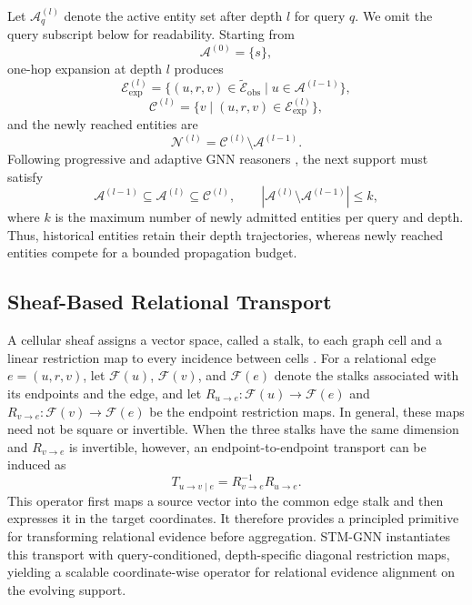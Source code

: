 \documentclass[a4paper,fleqn]{cas-sc}
\begin{document}
Let $\mathcal{A}_{q}^{(l)}$ denote the active entity set after depth $l$ for
query $q$. We omit the query subscript below for readability. Starting from
\begin{equation}
\mathcal{A}^{(0)}=\{s\},
\end{equation}
one-hop expansion at depth $l$ produces
\begin{equation}
\mathcal{E}_{\mathrm{exp}}^{(l)}
=
\{(u,r,v)\in\widetilde{\mathcal{E}}_{\mathrm{obs}}
\mid u\in\mathcal{A}^{(l-1)}\},
\end{equation}
\begin{equation}
\mathcal{C}^{(l)}
=
\{v\mid (u,r,v)\in\mathcal{E}_{\mathrm{exp}}^{(l)}\},
\end{equation}
and the newly reached entities are
\begin{equation}
\mathcal{N}^{(l)}
=
\mathcal{C}^{(l)}\setminus\mathcal{A}^{(l-1)}.
\end{equation}
Following progressive and adaptive GNN reasoners
\citep{zhu2021neural,zhang2022knowledge,zhang2022adaprop}, the next support must
satisfy
\begin{equation}
\mathcal{A}^{(l-1)}
\subseteq
\mathcal{A}^{(l)}
\subseteq
\mathcal{C}^{(l)},
\qquad
\left|\mathcal{A}^{(l)}\setminus\mathcal{A}^{(l-1)}\right|
\leq k,
\label{eq:support_constraints}
\end{equation}
where $k$ is the maximum number of newly admitted entities per query and depth.
Thus, historical entities retain their depth trajectories, whereas newly
reached entities compete for a bounded propagation budget.

\subsection{Sheaf-Based Relational Transport}\label{subsec:sheaf_preliminaries}

A cellular sheaf assigns a vector space, called a stalk, to each graph cell and
a linear restriction map to every incidence between cells
\citep{hansen2019spectral,bodnar2022neural}. For a relational edge
$e=(u,r,v)$, let $\mathcal{F}(u)$, $\mathcal{F}(v)$, and $\mathcal{F}(e)$
denote the stalks associated with its endpoints and the edge, and let
$R_{u\rightarrow e}:\mathcal{F}(u)\rightarrow\mathcal{F}(e)$ and
$R_{v\rightarrow e}:\mathcal{F}(v)\rightarrow\mathcal{F}(e)$ be the endpoint
restriction maps. In general, these maps need not be square or invertible.
When the three stalks have the same dimension and $R_{v\rightarrow e}$ is
invertible, however, an endpoint-to-endpoint transport can be induced as
\begin{equation}
T_{u\rightarrow v\mid e}
=
R_{v\rightarrow e}^{-1}R_{u\rightarrow e}.
\label{eq:generic_sheaf_transport}
\end{equation}
This operator first maps a source vector into the common edge stalk and then
expresses it in the target coordinates. It therefore provides a principled
primitive for transforming relational evidence before aggregation. STM-GNN
instantiates this transport with query-conditioned, depth-specific diagonal
restriction maps, yielding a scalable coordinate-wise operator for relational
evidence alignment on the evolving support.
\end{document}
